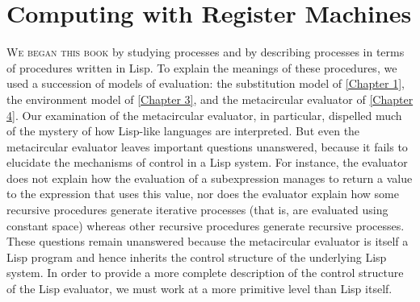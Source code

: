 \chapter{Computing with Register Machines}
\label{Chapter 5}



\vspace{2em}


\noindent
\lettrine[findent=1pt]{W}{e began this book} by studying processes and by describing processes in terms of procedures written in Lisp.
To explain the meanings of these procedures, we used a succession of models of evaluation:
the substitution model of \cref{Chapter 1}, the environment model of \cref{Chapter 3}, and the metacircular evaluator of \cref{Chapter 4}.
Our examination of the metacircular evaluator, in particular, dispelled much of the mystery of how Lisp-like languages are interpreted.
But even the metacircular evaluator leaves important questions unanswered, because it fails to elucidate the mechanisms of control in a Lisp system.
For instance, the evaluator does not explain how the evaluation of a subexpression manages to return a value to the expression that uses this value, nor does the evaluator explain how some recursive procedures generate iterative processes (that is, are evaluated using constant space) whereas other recursive procedures generate recursive processes.
These questions remain unanswered because the metacircular evaluator is itself a Lisp program and hence inherits the control structure of the underlying Lisp system.
In order to provide a more complete description of the control structure of the Lisp evaluator, we must work at a more primitive level than Lisp itself.

